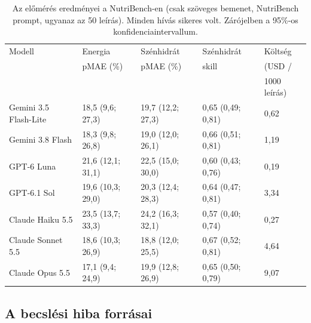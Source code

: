 \begin{table}[p]
\centering
\caption{Az előmérés eredményei a NutriBench-en (csak szöveges bemenet, NutriBench prompt, 
ugyanaz az 50 leírás). Minden hívás sikeres volt. Zárójelben a 95\%-os konfidenciaintervallum.}
\label{tab:elomeres_nutribench}
{\linespread{1}\selectfont\small\setlength{\tabcolsep}{3.5pt}
\begin{tabular}{lllll}
\hline
Modell & Energia & Szénhidrát & Szénhidrát & Költség \\
 & pMAE (\%) & pMAE (\%) & skill & (USD / \\
 & & & & 1000 leírás) \\
\hline
Gemini 3.5 Flash-Lite & 18,5 (9,6; 27,3) & 19,7 (12,2; 27,3) & 0,65 (0,49; 0,81) & 0,62 \\
Gemini 3.8 Flash & 18,3 (9,8; 26,8) & 19,0 (12,0; 26,1) & 0,66 (0,51; 0,81) & 1,19 \\
GPT-6 Luna & 21,6 (12,1; 31,1) & 22,5 (15,0; 30,0) & 0,60 (0,43; 0,76) & 0,19 \\
GPT-6.1 Sol & 19,6 (10,3; 29,0) & 20,3 (12,4; 28,3) & 0,64 (0,47; 0,81) & 3,34 \\
Claude Haiku 5.5 & 23,5 (13,7; 33,3) & 24,2 (16,3; 32,1) & 0,57 (0,40; 0,74) & 0,27 \\
Claude Sonnet 5.5 & 18,6 (10,3; 26,9) & 18,8 (12,0; 25,5) & 0,67 (0,52; 0,81) & 4,64 \\
Claude Opus 5.5 & 17,1 (9,4; 24,9) & 19,9 (12,8; 26,9) & 0,65 (0,50; 0,79) & 9,07 \\
\hline
\end{tabular}}
\end{table}

\subsection{A becslési hiba forrásai}
\label{sec:hibaforrasok}
